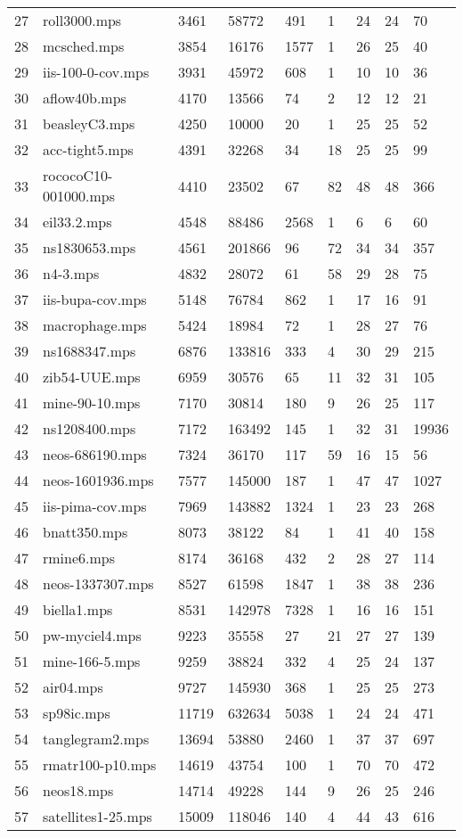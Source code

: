 \documentclass{article}
\begin{document}
\begin{longtable}{|l |l |l |l |l |l |l |l |l |}
27&roll3000.mps&3461&58772&491&1&24&24&70\\
28&mcsched.mps&3854&16176&1577&1&26&25&40\\
29&iis-100-0-cov.mps&3931&45972&608&1&10&10&36\\
30&aflow40b.mps&4170&13566&74&2&12&12&21\\
31&beasleyC3.mps&4250&10000&20&1&25&25&52\\
32&acc-tight5.mps&4391&32268&34&18&25&25&99\\
33&rococoC10-001000.mps&4410&23502&67&82&48&48&366\\
34&eil33.2.mps&4548&88486&2568&1&6&6&60\\
35&ns1830653.mps&4561&201866&96&72&34&34&357\\
36&n4-3.mps&4832&28072&61&58&29&28&75\\
37&iis-bupa-cov.mps&5148&76784&862&1&17&16&91\\
38&macrophage.mps&5424&18984&72&1&28&27&76\\
39&ns1688347.mps&6876&133816&333&4&30&29&215\\
40&zib54-UUE.mps&6959&30576&65&11&32&31&105\\
41&mine-90-10.mps&7170&30814&180&9&26&25&117\\
42&ns1208400.mps&7172&163492&145&1&32&31&19936\\
43&neos-686190.mps&7324&36170&117&59&16&15&56\\
44&neos-1601936.mps&7577&145000&187&1&47&47&1027\\
45&iis-pima-cov.mps&7969&143882&1324&1&23&23&268\\
46&bnatt350.mps&8073&38122&84&1&41&40&158\\
47&rmine6.mps&8174&36168&432&2&28&27&114\\
48&neos-1337307.mps&8527&61598&1847&1&38&38&236\\
49&biella1.mps&8531&142978&7328&1&16&16&151\\
50&pw-myciel4.mps&9223&35558&27&21&27&27&139\\
51&mine-166-5.mps&9259&38824&332&4&25&24&137\\
52&air04.mps&9727&145930&368&1&25&25&273\\
53&sp98ic.mps&11719&632634&5038&1&24&24&471\\
54&tanglegram2.mps&13694&53880&2460&1&37&37&697\\
55&rmatr100-p10.mps&14619&43754&100&1&70&70&472\\
56&neos18.mps&14714&49228&144&9&26&25&246\\
57&satellites1-25.mps&15009&118046&140&4&44&43&616\\

\end{longtable}
\end{document}
